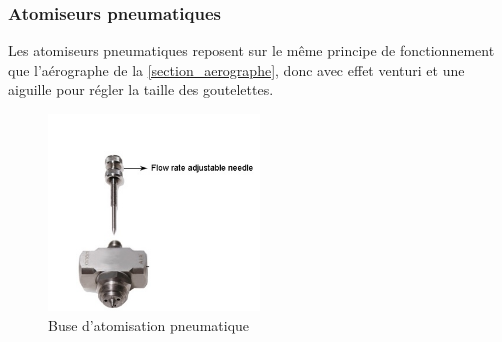 \subsubsection{Atomiseurs pneumatiques}
Les atomiseurs pneumatiques reposent sur le même principe de fonctionnement que l'aérographe de la \autoref{section_aerographe}, donc avec effet
venturi et une aiguille pour régler la taille des goutelettes.
\begin{figure}[H]
    \centering
    \includegraphics[width=0.5\textwidth]{assets/figures/etat_art/atomizing_nozzle.jpg}
    \caption[Buse d'atomisation pneumatique]{Buse d'atomisation pneumatique \autocite{photo_buse_atomisation}\footnotemark}
\end{figure}

